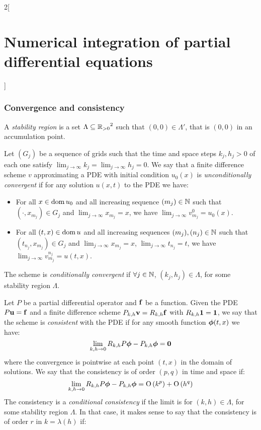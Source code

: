 \documentclass[../../../main_math.tex]{subfiles}
\begin{document}
\begin{multicols}{2}[\section{Numerical integration of partial differential equations}]
  \subsubsection{Convergence and consistency}
  \begin{definition}
    A \emph{stability region} is a set $\Lambda\subseteq{\ensuremath{\mathbb{R}}_{>0}}^2$ such that $(0,0)\in\Lambda'$, that is $(0,0)$ in an accumulation point.
  \end{definition}
  \begin{definition}
    Let $(G_j)$ be a sequence of grids such that the time and space steps $k_j,h_j>0$ of each one satisfy $\displaystyle \lim_{j\to\infty}k_j=\lim_{j\to\infty}h_j=0$.
    We say that a finite difference scheme $v$ approximating a PDE with initial condition $u_0(x)$ is \emph{unconditionally convergent} if for any solution $u(x,t)$ to the PDE we have:
    \begin{itemize}
      \item For all $x\in\operatorname{dom} u_0$ and all increasing sequence $(m_j)\in\mathbb{N}$ such that $(\cdot,x_{m_j})\in G_j$ and $\displaystyle\lim_{j\to\infty} x_{m_j}=x$, we have $\displaystyle\lim_{j\to\infty} v_{m_j}^0=u_0(x)$.
      \item For all $(t,x)\in\operatorname{dom} u$ and all increasing sequences $(m_j),(n_j)\in\mathbb{N}$ such that $(t_{n_j},x_{m_j})\in G_j$ and $\displaystyle\lim_{j\to\infty} x_{m_j}=x$, $\displaystyle\lim_{j\to\infty} t_{n_j}=t$, we have $\displaystyle\lim_{j\to\infty} v_{m_j}^{n_j}=u(t,x)$.
    \end{itemize}
    The scheme is \emph{conditionally convergent} if $\forall j\in\mathbb{N}$, $(k_j,h_j)\in\Lambda$, for some stability region $\Lambda$.
  \end{definition}
  \begin{definition}
    Let $P$ be a partial differential operator and $\boldsymbol{\mathrm{f}}$ be a function. Given the PDE $P\boldsymbol{\mathrm{u}}=\boldsymbol{\mathrm{f}}$ and a finite difference scheme $P_{k,h}\boldsymbol{\mathrm{v}}=R_{k,h}\boldsymbol{\mathrm{f}}$ with $R_{k,h}\boldsymbol{\mathrm{1}}=\boldsymbol{\mathrm{1}}$, we say that the scheme is \emph{consistent} with the PDE if for any smooth function $\boldsymbol{\mathrm{\phi}}(t,x)$ we have: $$\lim_{k,h\to 0}R_{k,h}P\boldsymbol{\mathrm{\phi}}-P_{k,h}\boldsymbol{\mathrm{\phi}}=\boldsymbol{\mathrm{0}}$$
    where the convergence is pointwise at each point $(t,x)$ in the domain of solutions. We say that the consistency is of order $(p,q)$ in time and space if: $$\lim_{k,h\to 0}R_{k,h}P\boldsymbol{\mathrm{\phi}}-P_{k,h}\boldsymbol{\mathrm{\phi}}=\mathrm{O}\left(k^p\right)+\mathrm{O}\left(h^q\right)$$  The consistency is a \emph{conditional consistency} if the limit is for $(k,h)\in \Lambda$, for some stability region $\Lambda$. In that case, it makes sense to say that the consistency is of order $r$ in $k=\lambda(h)$ if:

\end{definition}
\end{multicols}
\end{document}
